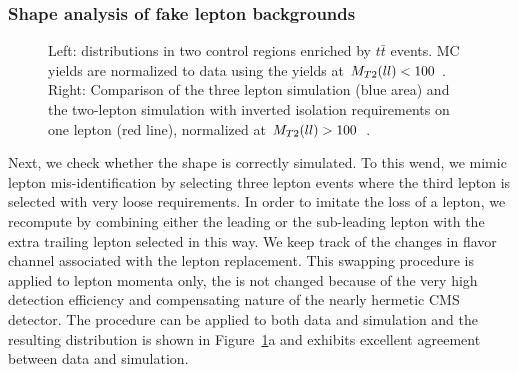 \subsubsection{ Shape analysis of fake lepton backgrounds }

\begin{figure}[!hbtp]
\centering
{}
\caption{Left: \mtll distributions in two control regions enriched by $t\bar{t}$ events. MC yields are normalized to data using the yields at $M_{T2}(ll)<100$ \GeV. Right: Comparison of the three lepton simulation (blue area) 
and the two-lepton simulation with inverted isolation requirements on one lepton (red line), normalized at $M_{T2}(ll)>100$~\GeV.}
\label{fig:ttBar_3l}
\end{figure}

Next, we check whether the \mtll shape is correctly simulated. To this wend, we mimic lepton mis-identification by selecting three lepton events where the third lepton is selected with very loose requirements. 
In order to imitate the loss of a lepton, we recompute \mtll by combining either the leading or the sub-leading lepton with the extra trailing lepton selected in this way.
We keep track of the changes in flavor channel associated with the lepton replacement.
This swapping procedure is applied to lepton momenta only, the \ETmiss is not changed because of the very high detection efficiency and compensating nature of the nearly hermetic CMS detector.
The procedure can be applied to both data and simulation and the resulting \mtll distribution is shown in Figure~\ref{fig:ttBar_3l}a and exhibits excellent agreement between data and simulation.


